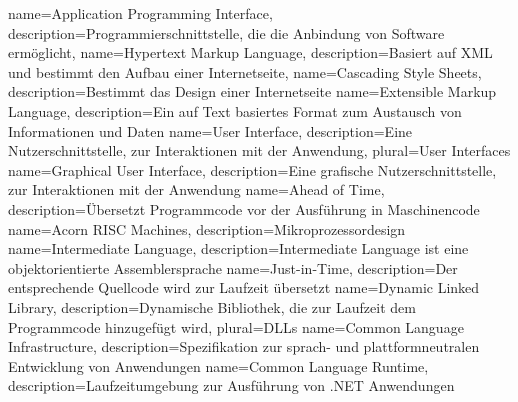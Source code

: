  {
	name={Application Programming Interface},
	description={Programmierschnittstelle, die die Anbindung von Software ermöglicht},
}
{
	name=Hypertext Markup Language,
	description={Basiert auf XML und bestimmt den Aufbau einer Internetseite},
}
{
	name=Cascading Style Sheets,
	description={Bestimmt das Design einer Internetseite}
}
{
	name=Extensible Markup Language,
	description={Ein auf Text basiertes Format zum Austausch von Informationen und Daten}
}
{
	name=User Interface,
	description={Eine Nutzerschnittstelle, zur Interaktionen mit der Anwendung},
	plural=User Interfaces
}
{
	name=Graphical User Interface,
	description={Eine grafische Nutzerschnittstelle, zur Interaktionen mit der Anwendung}
}
{
	name=Ahead of Time,
	description={Übersetzt Programmcode vor der Ausführung in Maschinencode}
}
{
	name=Acorn RISC Machines,
	description={Mikroprozessordesign}
}
{
	name=Intermediate Language,
	description={Intermediate Language ist eine objektorientierte Assemblersprache}
}
{
	name=Just-in-Time,
	description={Der entsprechende Quellcode wird zur Laufzeit übersetzt}
}
{
	name=Dynamic Linked Library,
	description={Dynamische Bibliothek, die zur Laufzeit dem Programmcode hinzugefügt wird},
	plural=DLLs
}
{
	name=Common Language Infrastructure,
	description={Spezifikation zur sprach- und plattformneutralen Entwicklung von Anwendungen}
}
{
	name=Common Language Runtime,
	description={Laufzeitumgebung zur Ausführung von .NET Anwendungen}
}
